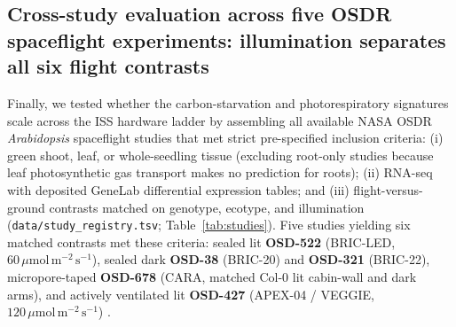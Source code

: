 \documentclass[final,5p,times,twocolumn,numbers,sort&compress]{elsarticle}
\newcommand{\ums}{\ensuremath{\mu\mathrm{mol\,m^{-2}\,s^{-1}}}}
\begin{document}
\subsection{Cross-study evaluation across five OSDR spaceflight experiments: illumination separates all six flight contrasts}\label{sec:ladder}

Finally, we tested whether the carbon-starvation and photorespiratory signatures scale across the ISS hardware ladder by assembling all available NASA OSDR \textit{Arabidopsis} spaceflight studies that met strict pre-specified inclusion criteria: (i) green shoot, leaf, or whole-seedling tissue (excluding root-only studies because leaf photosynthetic gas transport makes no prediction for roots); (ii) RNA-seq with deposited GeneLab differential expression tables; and (iii) flight-versus-ground contrasts matched on genotype, ecotype, and illumination (\texttt{data/study\_registry.tsv}; Table~\ref{tab:studies}). Five studies yielding six matched contrasts met these criteria: sealed lit \textbf{OSD-522} (BRIC-LED, $60\,\ums$), sealed dark \textbf{OSD-38} (BRIC-20) and \textbf{OSD-321} (BRIC-22), micropore-taped \textbf{OSD-678} (CARA, matched Col-0 lit cabin-wall and dark arms), and actively ventilated lit \textbf{OSD-427} (APEX-04 / VEGGIE, $120\,\ums$) \citep{osd522,osd38,osd321,osd678,osd427}.
\end{document}
